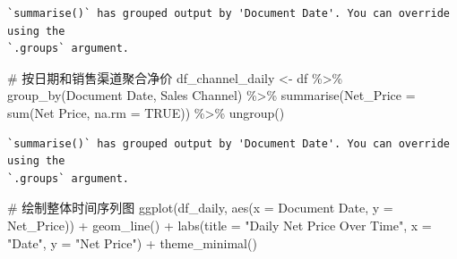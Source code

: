 \documentclass[
  letterpaper,
  DIV=11,
  numbers=noendperiod]{scrartcl}
\newenvironment{Shaded}{\begin{snugshade}}{\end{snugshade}}
\newcommand{\AttributeTok}[1]{\textcolor[rgb]{0.40,0.45,0.13}{#1}}
\newcommand{\CommentTok}[1]{\textcolor[rgb]{0.37,0.37,0.37}{#1}}
\newcommand{\ConstantTok}[1]{\textcolor[rgb]{0.56,0.35,0.01}{#1}}
\newcommand{\FunctionTok}[1]{\textcolor[rgb]{0.28,0.35,0.67}{#1}}
\newcommand{\NormalTok}[1]{\textcolor[rgb]{0.00,0.23,0.31}{#1}}
\newcommand{\OtherTok}[1]{\textcolor[rgb]{0.00,0.23,0.31}{#1}}
\newcommand{\SpecialCharTok}[1]{\textcolor[rgb]{0.37,0.37,0.37}{#1}}
\newcommand{\StringTok}[1]{\textcolor[rgb]{0.13,0.47,0.30}{#1}}
\begin{document}
\begin{verbatim}
`summarise()` has grouped output by 'Document Date'. You can override using the
`.groups` argument.
\end{verbatim}

\begin{Shaded}
\begin{Highlighting}[]
\CommentTok{\# 按日期和销售渠道聚合净价}
\NormalTok{df\_channel\_daily }\OtherTok{\textless{}{-}}\NormalTok{ df }\SpecialCharTok{\%\textgreater{}\%}
  \FunctionTok{group\_by}\NormalTok{(}\StringTok{\textasciigrave{}}\AttributeTok{Document Date}\StringTok{\textasciigrave{}}\NormalTok{, }\StringTok{\textasciigrave{}}\AttributeTok{Sales Channel}\StringTok{\textasciigrave{}}\NormalTok{) }\SpecialCharTok{\%\textgreater{}\%}
  \FunctionTok{summarise}\NormalTok{(}\AttributeTok{Net\_Price =} \FunctionTok{sum}\NormalTok{(}\StringTok{\textasciigrave{}}\AttributeTok{Net Price}\StringTok{\textasciigrave{}}\NormalTok{, }\AttributeTok{na.rm =} \ConstantTok{TRUE}\NormalTok{)) }\SpecialCharTok{\%\textgreater{}\%}
  \FunctionTok{ungroup}\NormalTok{()}
\end{Highlighting}
\end{Shaded}

\begin{verbatim}
`summarise()` has grouped output by 'Document Date'. You can override using the
`.groups` argument.
\end{verbatim}

\begin{Shaded}
\begin{Highlighting}[]
\CommentTok{\# 绘制整体时间序列图}
\FunctionTok{ggplot}\NormalTok{(df\_daily, }\FunctionTok{aes}\NormalTok{(}\AttributeTok{x =} \StringTok{\textasciigrave{}}\AttributeTok{Document Date}\StringTok{\textasciigrave{}}\NormalTok{, }\AttributeTok{y =}\NormalTok{ Net\_Price)) }\SpecialCharTok{+}
  \FunctionTok{geom\_line}\NormalTok{() }\SpecialCharTok{+}
  \FunctionTok{labs}\NormalTok{(}\AttributeTok{title =} \StringTok{"Daily Net Price Over Time"}\NormalTok{,}
       \AttributeTok{x =} \StringTok{"Date"}\NormalTok{, }\AttributeTok{y =} \StringTok{"Net Price"}\NormalTok{) }\SpecialCharTok{+}
  \FunctionTok{theme\_minimal}\NormalTok{()}
\end{Highlighting}
\end{Shaded}
\end{document}
